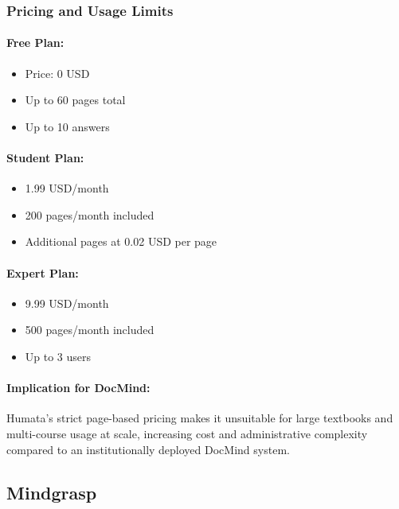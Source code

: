 \documentclass[12pt, a4paper, oneside]{report}
\let\oldsubsection\subsection
\renewcommand{\subsection}{%
  \addtocontents{toc}{\protect\needspace{3\baselineskip}}%
  \oldsubsection
}
\begin{document}
\subsubsection{Pricing and Usage Limits}

\paragraph{Free Plan:}
\begin{itemize}[noitemsep]
  \item Price: 0 USD
  \item Up to 60 pages total
  \item Up to 10 answers
\end{itemize}

\paragraph{Student Plan:}
\begin{itemize}[noitemsep]
  \item 1.99 USD/month
  \item 200 pages/month included
  \item Additional pages at 0.02 USD per page
\end{itemize}

\paragraph{Expert Plan:}
\begin{itemize}[noitemsep]
  \item 9.99 USD/month
  \item 500 pages/month included
  \item Up to 3 users
\end{itemize}

\paragraph{Implication for DocMind:}

Humata's strict page-based pricing makes it unsuitable for large textbooks and multi-course usage at scale, increasing cost and administrative complexity compared to an institutionally deployed DocMind system.

\newpage
\subsection{Mindgrasp}
\end{document}
